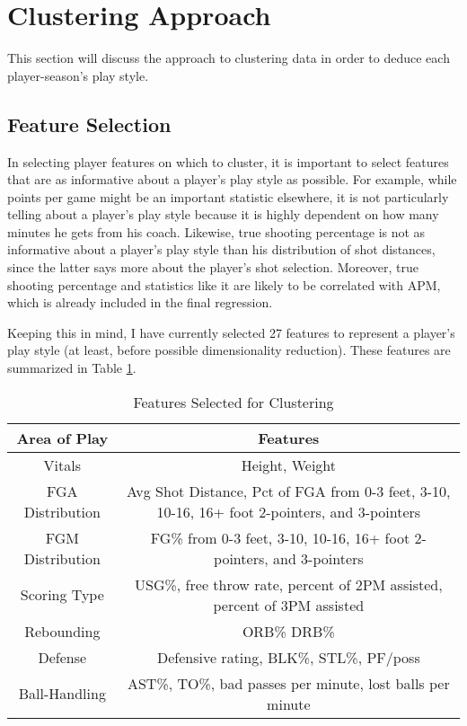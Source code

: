 \documentclass[12pt]{article}
\begin{document}
\section{Clustering Approach} \label{clustering}

This section will discuss the approach to clustering data in order to deduce
each player-season's play style.

\subsection{Feature Selection} \label{features}

In selecting player features on which to cluster, it is important to select
features that are as informative about a player's play style as possible. For
example, while points per game might be an important statistic elsewhere, it is
not particularly telling about a player's play style because it is highly
dependent on how many minutes he gets from his coach. Likewise, true shooting
percentage is not as informative about a player's play style than his
distribution of shot distances, since the latter says more about the player's
shot selection. Moreover, true shooting percentage and statistics like it are
likely to be correlated with APM, which is already included in the final
regression.

Keeping this in mind, I have currently selected 27 features to represent a
player's play style (at least, before possible dimensionality reduction). These features are summarized in Table \ref{tab:a}.

\begin{table}[!htb]
	\centering
	\begin{tabular}{|c|c|} \hline
		Area of Play & Features \\ \hline
		Vitals & Height, Weight \\ \hline
		FGA Distribution &
		\begin{minipage}[t]{0.6\columnwidth}
			Avg Shot Distance, Pct of FGA from 0-3 feet, 3-10, 10-16, 16+ foot
			2-pointers, and 3-pointers
		\end{minipage} \\ \hline
		FGM Distribution & FG\% from 0-3 feet, 3-10, 10-16, 16+ foot 2-pointers, and
		3-pointers \\ \hline
		Scoring Type & USG\%, free throw rate, percent of 2PM assisted,
		percent of 3PM assisted \\ \hline
		Rebounding & ORB\% DRB\% \\ \hline
		Defense & Defensive rating, BLK\%, STL\%, PF/poss \\ \hline
		Ball-Handling & AST\%, TO\%, bad passes per minute, lost balls per minute
		\\ \hline
	\end{tabular}
	\caption{Features Selected for Clustering} \label{tab:a}
\end{table}
\end{document}
